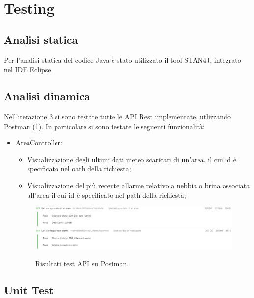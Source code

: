 \section{Testing}
\subsection{Analisi statica}
Per l'analisi statica del codice Java è stato utilizzato il tool STAN4J, integrato nel IDE Eclipse.

\subsection{Analisi dinamica}
Nell'iterazione 3 si sono testate tutte le API Rest implementate, utlizzando Postman (\Fig \ref{fig:RisultatiTestAPIIT3}). In particolare si sono testate le seguenti funzionalità:

\begin{itemize}
	\item AreaController:
	\begin{itemize}
		\item Visualizzazione degli ultimi dati meteo scaricati di un'area, il cui id è specificato nel oath della richiesta;
		\item Visualizzazione del più recente allarme relativo a nebbia o brina associata all'area il cui id è specificato nel path della richiesta;
	\end{itemize}

	\begin{figure}[h!]
		\centering
		\includegraphics[width=1\linewidth]{./Iterazione 3/ImageFiles/TestGetAprsData}
		\includegraphics[width=1\linewidth]{./Iterazione 3/ImageFiles/TestGetFrostOrFogAlarm}
		\caption{Risultati test API su Postman.}
		\label{fig:RisultatiTestAPIIT3}
	\end{figure}
\end{itemize}

\clearpage

\subsection{Unit Test}
